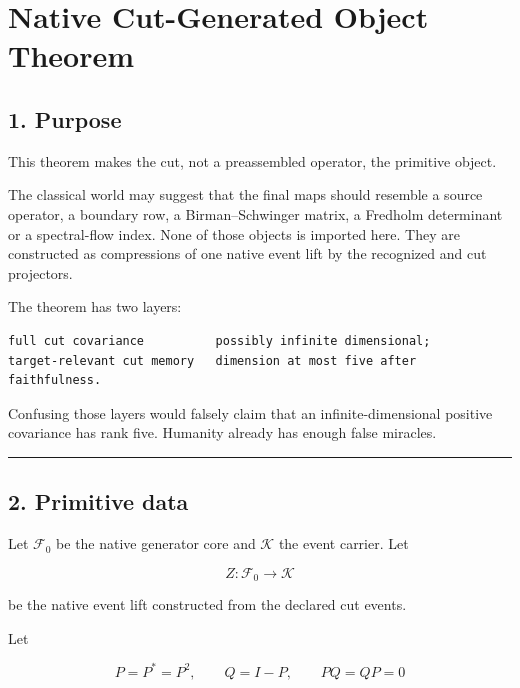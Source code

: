 \hypertarget{native-cut-generated-object-theorem}{%
\chapter{Native Cut-Generated Object Theorem}\label{native-cut-generated-object-theorem}}

\hypertarget{purpose}{%
\section{1. Purpose}\label{purpose}}

This theorem makes the cut, not a preassembled operator, the primitive object.

The classical world may suggest that the final maps should resemble a source
operator, a boundary row, a Birman--Schwinger matrix, a Fredholm determinant or
a spectral-flow index. None of those objects is imported here. They are
constructed as compressions of one native event lift by the recognized and cut
projectors.

The theorem has two layers:

\begin{verbatim}
full cut covariance          possibly infinite dimensional;
target-relevant cut memory   dimension at most five after faithfulness.
\end{verbatim}

Confusing those layers would falsely claim that an infinite-dimensional
positive covariance has rank five. Humanity already has enough false miracles.

\begin{center}\rule{0.5\linewidth}{0.5pt}\end{center}

\hypertarget{primitive-data}{%
\section{2. Primitive data}\label{primitive-data}}

Let \(\mathcal F_0\) be the native generator core and \(\mathcal K\) the event
carrier. Let

\[
Z:\mathcal F_0\longrightarrow\mathcal K
\]

be the native event lift constructed from the declared cut events.

Let

\[
P=P^*=P^2,
\qquad
Q=I-P,
\qquad
PQ=QP=0
\]

